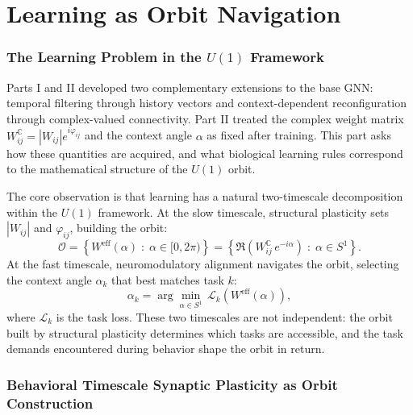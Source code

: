 \documentclass[11pt]{article}
\begin{document}
\part{Learning as Orbit Navigation}

\section{The Learning Problem in the $U(1)$ Framework}

Parts I and II developed two complementary extensions to the base
GNN: temporal filtering through history vectors and context-dependent
reconfiguration through complex-valued connectivity. Part II treated
the complex weight matrix $W_{ij}^{\mathbb{C}} = |W_{ij}|e^{i\varphi_{ij}}$
and the context angle $\alpha$ as fixed after training. This part asks
how these quantities are acquired, and what biological learning rules
correspond to the mathematical structure of the $U(1)$ orbit.

The core observation is that learning has a natural two-timescale
decomposition within the $U(1)$ framework. At the slow timescale,
structural plasticity sets $|W_{ij}|$ and $\varphi_{ij}$, building
the orbit:
\begin{equation}
\mathcal{O} = \left\{ W^{\text{eff}}(\alpha) \;:\; \alpha \in [0, 2\pi) \right\}
= \left\{ \Re\!\left(W_{ij}^{\mathbb{C}}\, e^{-i\alpha}\right) \;:\; \alpha \in S^1 \right\}.
\end{equation}
At the fast timescale, neuromodulatory alignment navigates the orbit,
selecting the context angle $\alpha_k$ that best matches task $k$:
\begin{equation}
\alpha_k = \arg\min_{\alpha \in S^1}\,
\mathcal{L}_k\!\left(W^{\text{eff}}(\alpha)\right),
\label{eq:alpha_learning}
\end{equation}
where $\mathcal{L}_k$ is the task loss. These two timescales are not
independent: the orbit built by structural plasticity determines which
tasks are accessible, and the task demands encountered during behavior
shape the orbit in return.

\section{Behavioral Timescale Synaptic Plasticity as Orbit Construction}
\end{document}
